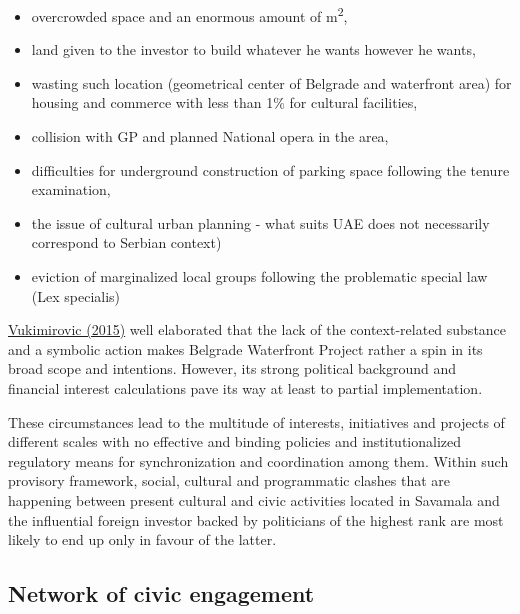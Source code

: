 \documentclass[11pt]{report}
\begin{document}
\begin{itemize}
\begin{itemize}
\item overcrowded space and an enormous amount of m\textsuperscript{2},
\item land given to the investor to build whatever he wants however he wants,
\item wasting such location (geometrical center of Belgrade and waterfront area) for housing and commerce with less than 1\% for cultural facilities,
\item collision with GP and planned National opera in the area,
\item difficulties for underground construction of parking space following the tenure examination,
\item the issue of cultural urban planning - what suits UAE does not necessarily correspond to Serbian context)
\item eviction of marginalized local groups following the problematic special law (Lex specialis)
\end{itemize}

\href{}{Vukimirovic (2015)} well elaborated that the lack of the context-related substance and a symbolic action makes Belgrade Waterfront Project rather a spin in its broad scope and intentions.
However, its strong political background and financial interest calculations pave its way at least to partial implementation.
\end{itemize}

These circumstances lead to the multitude of interests, initiatives and projects of different scales with no effective and binding policies and institutionalized regulatory means for synchronization and coordination among them.
Within such provisory framework, social, cultural and programmatic clashes that are happening between present cultural and civic activities located in Savamala and the influential foreign investor backed by politicians of the highest rank are most likely to end up only in favour of the latter.

\subsection{Network of civic engagement}
\end{document}
